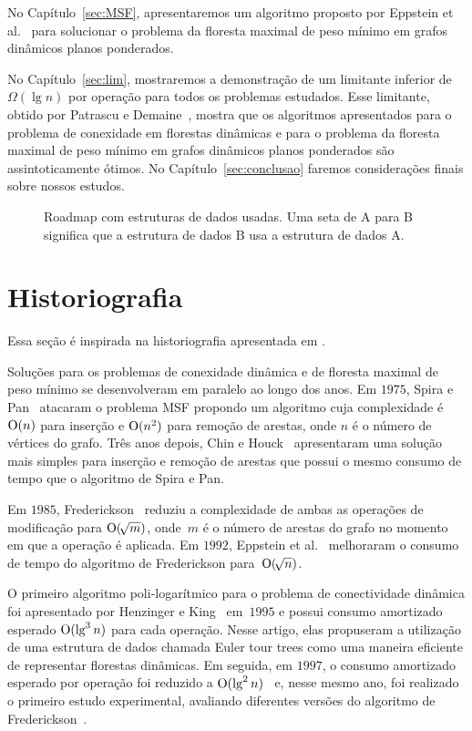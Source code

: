 No Capítulo~\ref{sec:MSF}, apresentaremos um algoritmo proposto por Eppstein et al.~\cite{EPPSTEIN-planar} para solucionar o problema da floresta maximal de peso mínimo em grafos dinâmicos planos ponderados.

No Capítulo~\ref{sec:lim}, mostraremos a demonstração de um limitante inferior de~$\Omega(\lg n)$ por operação para todos os problemas estudados.
Esse limitante, obtido por Patrascu e Demaine~\cite{lowerBoundPatrascu}, mostra que os algoritmos apresentados para o problema de conexidade em florestas dinâmicas e para o problema da floresta maximal de peso mínimo em grafos dinâmicos planos ponderados são assintoticamente ótimos.
No Capítulo~\ref{sec:conclusao} faremos considerações finais sobre nossos estudos.


\begin{figure}[htb]
\centering

\caption{Roadmap com estruturas de dados usadas. Uma seta de A para B significa que a estrutura de dados B usa a estrutura de dados A.}
\label{fig:roadmap}
\end{figure}

\section{Historiografia}

Essa seção é inspirada na historiografia apresentada em \cite{HHSRecentAdvances2022, Zaroliagis2002}.

Soluções para os problemas de conexidade dinâmica e de floresta maximal de peso mínimo se desenvolveram em paralelo ao longo dos anos. Em $1975$, Spira e Pan~\cite{SP1975} atacaram o problema MSF propondo um algoritmo cuja complexidade é $\mathrm{O}(n)$ para inserção e $\mathrm{O}(n^2)$ para remoção de arestas, onde $n$ é o número de vértices do grafo. Três anos depois, Chin e Houck~\cite{CH1978} apresentaram uma solução mais simples para inserção e remoção de arestas que possui o mesmo consumo de tempo que o algoritmo de Spira e Pan.

Em $1985$, Frederickson~\cite{frederickson1983data} reduziu a complexidade de ambas as operações de modificação para $\mathrm{O}(\!\sqrt{m})$, onde~$m$ é o número de arestas do grafo no momento em que a operação é aplicada.
Em $1992$, Eppstein et al.~\cite{Eppstein1992SparsificationaTF,Eppstein1997SparsificationaTF} melhoraram o consumo de tempo do algoritmo de Frederickson para~$\mathrm{O}(\!\sqrt{n})$.

O primeiro algoritmo poli-logarítmico para o problema de conectividade dinâmica foi apresentado por Henzinger e King~\cite{HenzingerKing} em~$1995$ e possui consumo amortizado esperado $\mathrm{O}(\lg^3 n)$ para cada operação. Nesse artigo, elas propuseram a utilização de uma estrutura de dados chamada Euler tour trees como uma maneira eficiente de representar florestas dinâmicas.
Em seguida, em $1997$, o consumo amortizado esperado por operação foi reduzido a $\mathrm{O}(\lg^2 n)$~\cite{HenzingerThorup} e, nesse mesmo ano, foi realizado o primeiro estudo experimental, avaliando diferentes versões do algoritmo de Frederickson~\cite{xpAnalyGiuseppe}.

